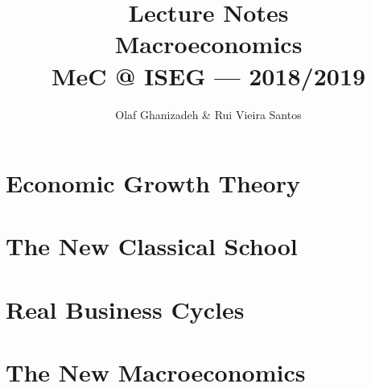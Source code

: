 \documentclass[12pt]{report}
\begin{document}
 
 
 
\title{
Lecture Notes \\
\large Macroeconomics \\
MeC @ ISEG --- 2018/2019
}
\author{Olaf Ghanizadeh \& Rui Vieira Santos}



 
\maketitle

 
\tableofcontents

\newpage

\chapter{Economic Growth Theory}

\chapter{The New Classical School}

\chapter{Real Business Cycles}

\newpage

\newpage
\chapter{The New Macroeconomics}



\printbibliography





 
 
\end{document}
